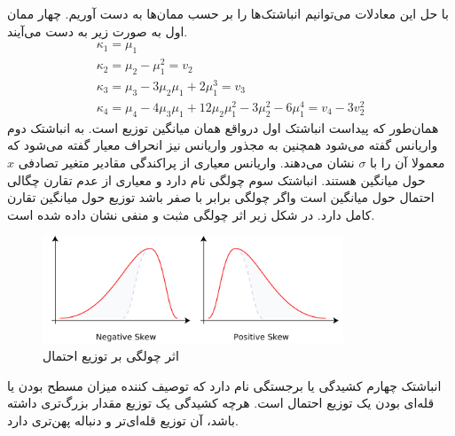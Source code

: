 \FloatBarrier
با حل این معادلات می‌توانیم انباشتک‌ها را بر حسب ممان‌ها به دست آوریم. چهار ممان اول به صورت زیر به دست می‌آیند.
\begin{equation}
\begin{array}{l}{\kappa_{1}=\mu_{1}} \\ {\kappa_{2}=\mu_{2}-\mu_{1}^{2}=v_{2}} \\ {\kappa_{3}=\mu_{3}-3 \mu_{2} \mu_{1}+2 \mu_{1}^{3}=v_{3}} \\ {\kappa_{4}=\mu_{4}-4 \mu_{3} \mu_{1}+12 \mu_{2} \mu_{1}^{2}-3 \mu_{2}^{2}-6 \mu_{1}^{4}=v_{4}-3 v_{2}^{2}}\end{array}
\end{equation}
همان‌طور که پیداست انباشتک اول درواقع همان میانگین توزیع است. به انباشتک دوم واریانس گفته می‌شود  همچنین به مجذور واریانس نیز انحراف معیار گفته می‌شود که معمولا آن را با $\sigma$ نشان می‌دهند. واریانس معیاری از پراکندگی مقادیر متغیر تصادفی $x$ حول میانگین هستند.
انباشتک سوم چولگی نام دارد و معیاری از عدم تقارن چگالی احتمال حول میانگین است واگر چولگی برابر با صفر باشد توزیع حول میانگین تقارن کامل دارد. در شکل زیر اثر چولگی مثبت و منفی نشان داده شده است.

\begin{figure}[htb]
    \centering
    \includegraphics[width=0.8\textwidth]{images/skewness.pdf}
    \caption{اثر چولگی بر توزیع احتمال\cite{wiki:xxx}} %
    \par\medskip
\captionsetup{justification=centering}
\end{figure}
\FloatBarrier

انباشتک چهارم کشیدگی یا برجستگی نام دارد که توصیف کننده میزان مسطح بودن یا قله‌ای بودن یک توزیع احتمال است. هرچه کشیدگی یک توزیع مقدار بزرگ‌تری داشته باشد، آن توزیع قله‌ای‌تر و دنباله پهن‌تری دارد. 


